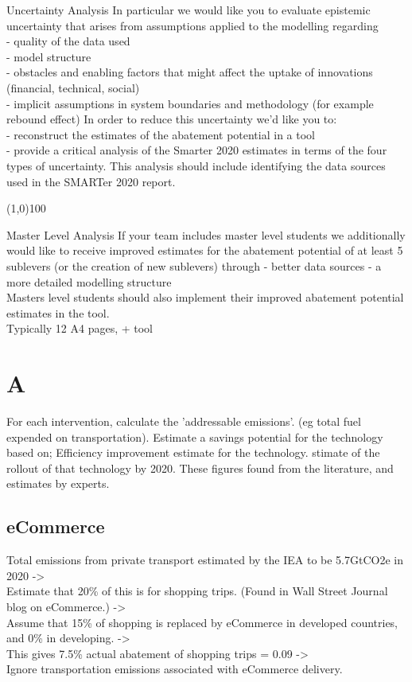 \documentclass[11pt, twocolumn]{article}
\begin{document}
Uncertainty Analysis
In particular we would like you to evaluate epistemic uncertainty that arises from assumptions applied to the modelling regarding\\
- quality of the data used\\
- model structure\\
- obstacles and enabling factors that might affect the uptake of innovations (financial, technical, social)\\
- implicit assumptions in system boundaries and methodology (for example rebound effect) In order to reduce this uncertainty we’d like you to:\\
- reconstruct the estimates of the abatement potential in a tool\\
- provide a critical analysis of the Smarter 2020 estimates in terms of the four types of uncertainty. This analysis should include identifying the data sources used in the SMARTer 2020 report.

\line(1,0){100}

Master Level Analysis
If your team includes master level students we additionally would like to receive improved estimates for the abatement potential of at least 5 sublevers (or the creation of new sublevers) through
- better data sources
- a more detailed modelling structure\\

Masters level students should also implement their improved abatement potential estimates in the tool.\\

Typically 12 A4 pages, + tool

\section{A}
For each intervention, calculate the 'addressable emissions'. (eg total fuel expended on transportation).
Estimate a savings potential for the technology based on;   Efficiency improvement estimate for the technology. stimate of the rollout of that technology by 2020.
These figures found from the literature, and estimates by experts.

\subsection{eCommerce}
Total emissions from private transport estimated by the IEA to be 5.7GtCO2e in 2020 ->\\
Estimate that 20\% of this is for shopping trips. (Found in Wall Street Journal blog on eCommerce.) ->\\
Assume that 15\% of shopping is replaced by eCommerce in developed countries, and 0\% in developing. ->\\
This gives 7.5\% actual abatement of shopping trips = 0.09 -> \\
Ignore transportation emissions associated with eCommerce delivery.\\
\end{document}
